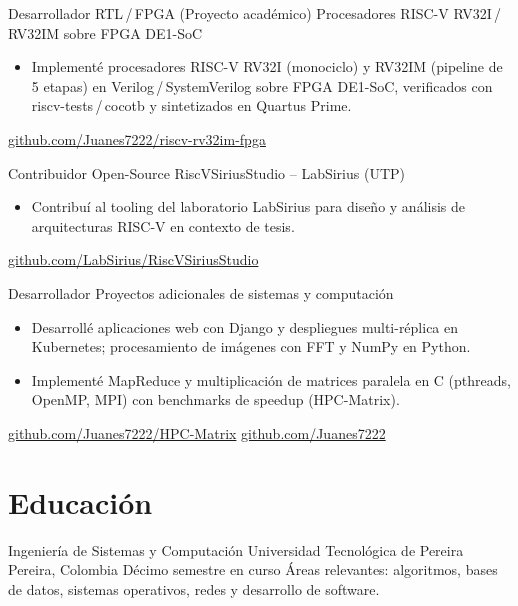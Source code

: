 \documentclass[11pt,a4paper,sans]{moderncv}
\begin{document}
  {Desarrollador RTL\,/\,FPGA (Proyecto académico)}
  {Procesadores RISC-V RV32I\,/\,RV32IM sobre FPGA DE1-SoC}
  {}{}
  {\begin{itemize}
     \item Implementé procesadores RISC-V RV32I (monociclo) y RV32IM
           (pipeline de 5 etapas) en Verilog\,/\,SystemVerilog sobre FPGA
           DE1-SoC, verificados con riscv-tests\,/\,cocotb y sintetizados
           en Quartus Prime.
   \end{itemize}
   \footnotesize\href{https://github.com/Juanes7222/riscv-rv32im-fpga}{github.com/Juanes7222/riscv-rv32im-fpga}}

  {Contribuidor Open-Source}
  {RiscVSiriusStudio -- LabSirius (UTP)}
  {}{}
  {\begin{itemize}
     \item Contribuí al tooling del laboratorio LabSirius para diseño y
           análisis de arquitecturas RISC-V en contexto de tesis.
   \end{itemize}
   \footnotesize\href{https://github.com/LabSirius/RiscVSiriusStudio}{github.com/LabSirius/RiscVSiriusStudio}}

  {Desarrollador}
  {Proyectos adicionales de sistemas y computación}
  {}{}
  {\begin{itemize}
     \item Desarrollé aplicaciones web con Django y despliegues
           multi-réplica en Kubernetes; procesamiento de imágenes con FFT y
           NumPy en Python.
     \item Implementé MapReduce y multiplicación de matrices paralela en C
           (pthreads, OpenMP, MPI) con benchmarks de speedup (HPC-Matrix).
   \end{itemize}
   \footnotesize\href{https://github.com/Juanes7222/HPC-Matrix}{github.com/Juanes7222/HPC-Matrix} \textbullet{} \footnotesize\href{https://github.com/Juanes7222}{github.com/Juanes7222}}

\section{Educación}
  {Ingeniería de Sistemas y Computación}
  {Universidad Tecnológica de Pereira}
  {Pereira, Colombia}
  {Décimo semestre en curso}
  {Áreas relevantes: algoritmos, bases de datos, sistemas operativos,
   redes y desarrollo de software.}
\end{document}
